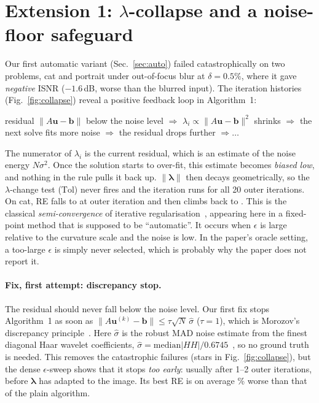 \section{Extension 1: $\lambda$-collapse and a noise-floor safeguard}
\label{sec:collapse}
Our first automatic variant (Sec.~\ref{sec:auto}) failed catastrophically on two
problems, cat and portrait under out-of-focus blur at $\delta=0.5\%$, where it gave
\emph{negative} ISNR ($-1.6$\,dB, worse than the blurred input). The iteration
histories (Fig.~\ref{fig:collapse}) reveal a positive feedback loop in
Algorithm~1:
\begin{center}
residual $\|A\mathbf u-\mathbf b\|$ below the noise level
$\Rightarrow$ $\lambda_i\propto\|A\mathbf u-\mathbf b\|^2$ shrinks
$\Rightarrow$ the next solve fits more noise
$\Rightarrow$ the residual drops further $\Rightarrow\dots$
\end{center}
The numerator of $\lambda_i$ is the current residual, which is an estimate of the noise
energy $N\sigma^2$. Once the solution starts to over-fit, this estimate becomes
\emph{biased low}, and nothing in the rule pulls it back up. $\|\boldsymbol\lambda\|$ then
decays geometrically, so the $\lambda$-change test ($\mathrm{Tol}$) never fires
and the iteration runs for all 20 outer iterations. On cat, RE falls to
\nCollReMin{} at outer iteration \nCollKmin{} and then climbs back to \nCollReFinal.
This is the classical \emph{semi-convergence} of iterative regularisation~\cite{engl},
appearing here in a fixed-point method that is supposed to be ``automatic''.
It occurs when $\epsilon$ is large relative to the curvature scale and the noise is low.
In the paper's oracle setting, a too-large $\epsilon$ is simply never selected, which is
probably why the paper does not report it.

\paragraph{Fix, first attempt: discrepancy stop.} The residual should never fall
below the noise level. Our first fix stops Algorithm~1 as soon as
$\|A\mathbf u^{(k)}-\mathbf b\|\le\tau\sqrt N\,\hat\sigma$ ($\tau=1$), which is Morozov's
discrepancy principle~\cite{morozov}. Here $\hat\sigma$ is the robust MAD noise estimate
from the finest diagonal Haar wavelet coefficients,
$\hat\sigma=\mathrm{median}|HH|/0.6745$~\cite{donoho}, so no ground truth is needed.
This removes the catastrophic failures (stars in Fig.~\ref{fig:collapse}), but the dense
$\epsilon$-sweep shows that it stops \emph{too early}: usually after 1--2 outer
iterations, before $\boldsymbol\lambda$ has adapted to the image. Its best RE is on average
\nStopMinLoss\% worse than that of the plain algorithm.

